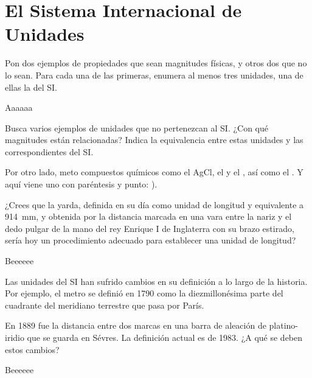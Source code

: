 \documentclass[
]{article}
\author{}
\date{}
\begin{document}
\hypertarget{el-sistema-internacional-de-unidades}{%
\section{El Sistema Internacional de
Unidades}\label{el-sistema-internacional-de-unidades}}

\begin{exercise}Pon dos ejemplos de propiedades que sean magnitudes
físicas, y otros dos que no lo sean. Para cada una de las primeras,
enumera al menos tres unidades, una de ellas la del SI.\end{exercise}

\begin{solution}Aaaaaa\end{solution}

\begin{exercise}Busca varios ejemplos de unidades que no pertenezcan al
SI. ¿Con qué magnitudes están relacionadas? Indica la equivalencia entre
estas unidades y las correspondientes del SI.

Por otro lado, meto compuestos químicos como el AgCl, el  y
el , así como el . Y aquí viene uno con
paréntesis y punto: ).\end{exercise}

\begin{exercise}[OXF15] ¿Crees que la yarda, definida en su día como
unidad de longitud y equivalente a 914~mm, y obtenida por la distancia
marcada en una vara entre la nariz y el dedo pulgar de la mano del rey
Enrique I de Inglaterra con su brazo estirado, sería hoy un
procedimiento adecuado para establecer una unidad de
longitud?\end{exercise}

\begin{solution}Beeeeee\end{solution}

\begin{exercise}Las unidades del SI han sufrido cambios en su definición
a lo largo de la historia. Por ejemplo, el metro se definió en 1790 como
la diezmillonésima parte del cuadrante del meridiano terrestre que pasa
por París.

En 1889 fue la distancia entre dos marcas en una barra de aleación de
platino-iridio que se guarda en Sévres. La definición actual es de 1983.
¿A qué se deben estos cambios?\end{exercise}

\begin{solution}Beeeeee\end{solution}
\end{document}
